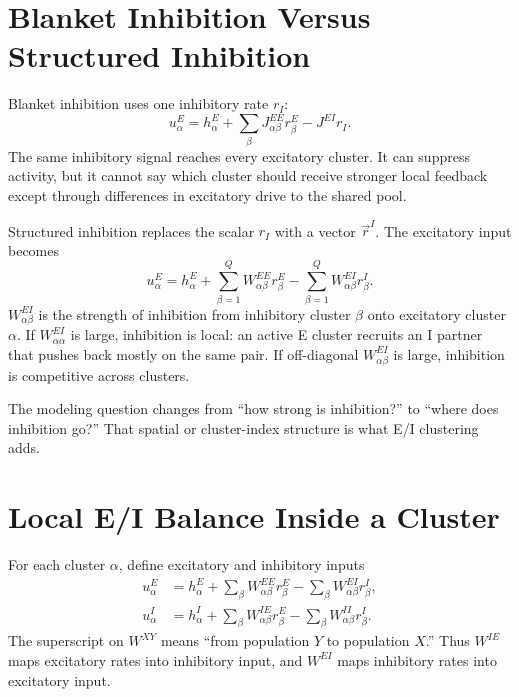 \section{Blanket Inhibition Versus Structured Inhibition}
\label{sec:blanket-versus-structured-inhibition}

Blanket inhibition uses one inhibitory rate $r_I$:
%
\begin{equation}
  u_{\alpha}^{E}
  =
  h_{\alpha}^{E}
  +
  \sum_{\beta}J_{\alpha\beta}^{EE}r_{\beta}^{E}
  -
  J^{EI}r_I .
  \label{eq:blanket-inhibition-input}
\end{equation}
%
The same inhibitory signal reaches every excitatory cluster. It can suppress activity, but it cannot say which cluster should receive stronger local feedback except through differences in excitatory drive to the shared pool.

Structured inhibition replaces the scalar $r_I$ with a vector $\vec r^{I}$. The excitatory input becomes
%
\begin{equation}
  u_{\alpha}^{E}
  =
  h_{\alpha}^{E}
  +
  \sum_{\beta=1}^{Q}W_{\alpha\beta}^{EE}r_{\beta}^{E}
  -
  \sum_{\beta=1}^{Q}W_{\alpha\beta}^{EI}r_{\beta}^{I}.
  \label{eq:structured-inhibition-input}
\end{equation}
%
$W_{\alpha\beta}^{EI}$ is the strength of inhibition from inhibitory cluster $\beta$ onto excitatory cluster $\alpha$. If $W_{\alpha\alpha}^{EI}$ is large, inhibition is local: an active E cluster recruits an I partner that pushes back mostly on the same pair. If off-diagonal $W_{\alpha\beta}^{EI}$ is large, inhibition is competitive across clusters.

The modeling question changes from ``how strong is inhibition?'' to ``where does inhibition go?'' That spatial or cluster-index structure is what E/I clustering adds.

\section{Local E/I Balance Inside a Cluster}
\label{sec:local-ei-balance-inside-cluster}

For each cluster $\alpha$, define excitatory and inhibitory inputs
%
\begin{align}
  u_{\alpha}^{E}
  &=
  h_{\alpha}^{E}
  +
  \sum_{\beta}W_{\alpha\beta}^{EE}r_{\beta}^{E}
  -
  \sum_{\beta}W_{\alpha\beta}^{EI}r_{\beta}^{I},
  \label{eq:ei-input-e}\\
  u_{\alpha}^{I}
  &=
  h_{\alpha}^{I}
  +
  \sum_{\beta}W_{\alpha\beta}^{IE}r_{\beta}^{E}
  -
  \sum_{\beta}W_{\alpha\beta}^{II}r_{\beta}^{I}.
  \label{eq:ei-input-i}
\end{align}
%
The superscript on $W^{XY}$ means ``from population $Y$ to population $X$.'' Thus $W^{IE}$ maps excitatory rates into inhibitory input, and $W^{EI}$ maps inhibitory rates into excitatory input.

